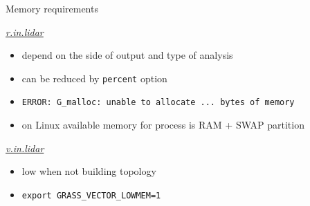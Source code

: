 \documentclass[xcolor={dvipsnames,usenames},beamer,aspectratio=169]{beamer}
\newcommand{\gmodule}[1]{\href{http://grass.osgeo.org/grass71/manuals/#1.html}{\emph{#1}}}
\begin{document}
\begin{frame}{Memory requirements}

\begin{block}{\gmodule{r.in.lidar}}
 \begin{itemize}
  \item depend on the side of output and type of analysis
  \item can be reduced by \texttt{percent} option
  \item \texttt{ERROR: G\_malloc: unable to allocate ... bytes of memory}
  \item on Linux available memory for process is RAM + SWAP partition
 \end{itemize}
\end{block}


\begin{block}{\gmodule{v.in.lidar}}
 \begin{itemize}
  \item low when not building topology
  \item \texttt{export GRASS\_VECTOR\_LOWMEM=1}
 \end{itemize}
\end{block}

\end{frame}
\end{document}
